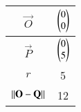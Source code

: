 
\begin{tabular}[]{|c|c|}
\hline
$\vec{O}$	& $\begin{pmatrix}0\\0\end{pmatrix}$ \\ \hline
$\vec{P}$	& $\begin{pmatrix}0\\5\end{pmatrix}$ \\ \hline
$r$		& 5 \\ \hline
$\left\lVert\mathbf{O} -\mathbf{Q}\right\rVert$ & 12\\ \hline
\end{tabular}
